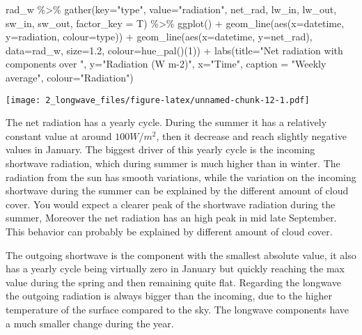 \documentclass[
]{article}
\newenvironment{Shaded}{\begin{snugshade}}{\end{snugshade}}
\newcommand{\AttributeTok}[1]{\textcolor[rgb]{0.77,0.63,0.00}{#1}}
\newcommand{\DecValTok}[1]{\textcolor[rgb]{0.00,0.00,0.81}{#1}}
\newcommand{\FloatTok}[1]{\textcolor[rgb]{0.00,0.00,0.81}{#1}}
\newcommand{\FunctionTok}[1]{\textcolor[rgb]{0.00,0.00,0.00}{#1}}
\newcommand{\NormalTok}[1]{#1}
\newcommand{\SpecialCharTok}[1]{\textcolor[rgb]{0.00,0.00,0.00}{#1}}
\newcommand{\StringTok}[1]{\textcolor[rgb]{0.31,0.60,0.02}{#1}}
\begin{document}
\begin{Shaded}
\begin{Highlighting}[]
\NormalTok{rad\_w }\SpecialCharTok{\%\textgreater{}\%}
  \FunctionTok{gather}\NormalTok{(}\AttributeTok{key=}\StringTok{"type"}\NormalTok{, }\AttributeTok{value=}\StringTok{"radiation"}\NormalTok{, net\_rad, lw\_in, lw\_out, sw\_in, sw\_out,}
         \AttributeTok{factor\_key =}\NormalTok{ T) }\SpecialCharTok{\%\textgreater{}\%}
\FunctionTok{ggplot}\NormalTok{() }\SpecialCharTok{+}
  \FunctionTok{geom\_line}\NormalTok{(}\FunctionTok{aes}\NormalTok{(}\AttributeTok{x=}\NormalTok{datetime, }\AttributeTok{y=}\NormalTok{radiation, }\AttributeTok{colour=}\NormalTok{type)) }\SpecialCharTok{+}
  \FunctionTok{geom\_line}\NormalTok{(}\FunctionTok{aes}\NormalTok{(}\AttributeTok{x=}\NormalTok{datetime, }\AttributeTok{y=}\NormalTok{net\_rad), }\AttributeTok{data=}\NormalTok{rad\_w, }\AttributeTok{size=}\FloatTok{1.2}\NormalTok{,}
            \AttributeTok{colour=}\FunctionTok{hue\_pal}\NormalTok{()(}\DecValTok{1}\NormalTok{)) }\SpecialCharTok{+}
  \FunctionTok{labs}\NormalTok{(}\AttributeTok{title=}\StringTok{"Net radiation with components over "}\NormalTok{, }\AttributeTok{y=}\StringTok{"Radiation (W m{-}2)"}\NormalTok{,}
       \AttributeTok{x=}\StringTok{"Time"}\NormalTok{, }\AttributeTok{caption =} \StringTok{"Weekly average"}\NormalTok{, }\AttributeTok{colour=}\StringTok{"Radiation"}\NormalTok{)}
\end{Highlighting}
\end{Shaded}

\texttt{[image: 2\_longwave\_files/figure-latex/unnamed-chunk-12-1.pdf]}

The net radiation has a yearly cycle. During the summer it has a
relatively constant value at around \(100 W/m^2\), then it decrease and
reach slightly negative values in January. The biggest driver of this
yearly cycle is the incoming shortwave radiation, which during summer is
much higher than in winter. The radiation from the sun has smooth
variations, while the variation on the incoming shortwave during the
summer can be explained by the different amount of cloud cover. You
would expect a clearer peak of the shortwave radiation during the
summer, Moreover the net radiation has an high peak in mid late
September. This behavior can probably be explained by different amount
of cloud cover.

The outgoing shortwave is the component with the smallest absolute
value, it also has a yearly cycle being virtually zero in January but
quickly reaching the max value during the spring and then remaining
quite flat. Regarding the longwave the outgoing radiation is always
bigger than the incoming, due to the higher temperature of the surface
compared to the sky. The longwave components have a much smaller change
during the year.
\end{document}
